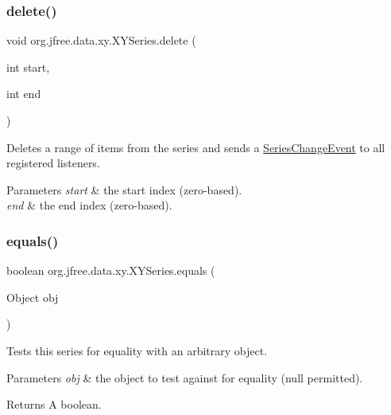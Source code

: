 \subsubsection{\texorpdfstring{delete()}{delete()}}
{\footnotesize\ttfamily void org.\+jfree.\+data.\+xy.\+X\+Y\+Series.\+delete (\begin{DoxyParamCaption}\item[{int}]{start,  }\item[{int}]{end }\end{DoxyParamCaption})}

Deletes a range of items from the series and sends a \mbox{\hyperlink{}{Series\+Change\+Event}} to all registered listeners.


\begin{DoxyParams}{Parameters}
{\em start} & the start index (zero-\/based). \\
\hline
{\em end} & the end index (zero-\/based). \\
\hline
\end{DoxyParams}
\mbox{\label{classorg_1_1jfree_1_1data_1_1xy_1_1_x_y_series_a295efdc62e75f67f44b12cb11ea1cb0d}} 
\subsubsection{\texorpdfstring{equals()}{equals()}}
{\footnotesize\ttfamily boolean org.\+jfree.\+data.\+xy.\+X\+Y\+Series.\+equals (\begin{DoxyParamCaption}\item[{Object}]{obj }\end{DoxyParamCaption})}

Tests this series for equality with an arbitrary object.


\begin{DoxyParams}{Parameters}
{\em obj} & the object to test against for equality ({\ttfamily null} permitted).\\
\hline
\end{DoxyParams}
\begin{DoxyReturn}{Returns}
A boolean. 
\end{DoxyReturn}
\mbox{\label{classorg_1_1jfree_1_1data_1_1xy_1_1_x_y_series_a4f29b263ea1deae978f94f1ab8e83272}} 
